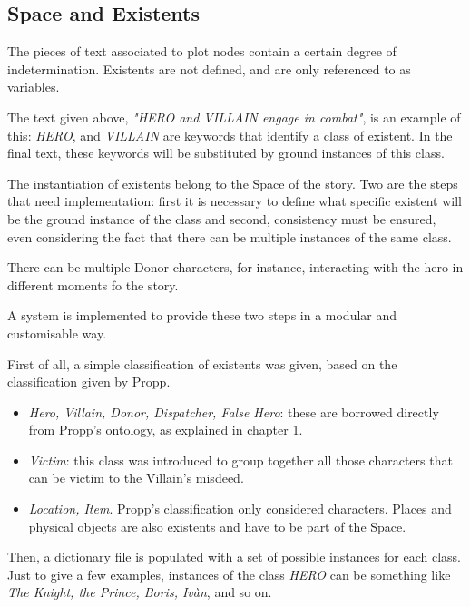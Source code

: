\documentclass[12pt,a4paper,oneside]{report}
\begin{document}
\subsection{Space and Existents}
The pieces of text associated to plot nodes contain a certain degree of indetermination. Existents are not defined, and are only referenced to as variables.

The text given above, \textit{"HERO and VILLAIN engage in combat"}, is an example of this: \textit{HERO}, and \textit{VILLAIN} are keywords that identify a class of existent. In the final text, these keywords will be substituted by ground instances of this class.

\bigskip

The instantiation of existents belong to the Space of the story. Two are the steps that need implementation: first it is necessary to define what specific existent will be the ground instance of the class and second, consistency must be ensured, even considering the fact that there can be multiple instances of the same class. 

There can be multiple Donor characters, for instance, interacting with the hero in different moments fo the story.

A system is implemented to provide these two steps in a modular and customisable way.

\bigskip

First of all, a simple classification of existents was given, based on the classification given by Propp.

\begin{itemize}\setlength{\itemsep}{0pt}
\item \textit{Hero, Villain, Donor, Dispatcher, False Hero}: these are borrowed directly from Propp's ontology, as explained in chapter 1.
\item \textit{Victim}: this class was introduced to group together all those characters that can be victim to the Villain's misdeed.
\item \textit{Location, Item}. Propp's classification only considered characters. Places and physical objects are also existents and have to be part of the Space.
\end{itemize}

Then, a dictionary file is populated with a set of possible instances for each class. Just to give a few examples, instances of the class \textit{HERO} can be something like \textit{The Knight, the Prince, Boris, Ivàn}, and so on. 
\end{document}
